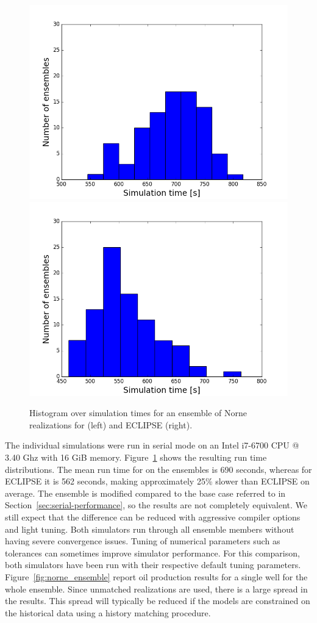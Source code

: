 \begin{figure}
  \includegraphics[width=.49\textwidth]{figures/norne/runTimeNorne.png} \hfill
  \includegraphics[width=.49\textwidth]{figures/norne/runTimeNorneEcl.png}
  \caption{Histogram over simulation times for an ensemble of Norne realizations for
    \opmflow (left) and ECLIPSE (right).}
  \label{fig:norne_performance}
\end{figure}

The individual simulations were run in serial mode on an Intel i7-6700 CPU @ 3.40 Ghz with 16 GiB memory. 
Figure~\ref{fig:norne_performance} shows the resulting run time distributions.
The mean run time for \opmflow on the ensembles is 690 seconds, whereas for ECLIPSE it
is 562 seconds, making \opmflow approximately 25\% slower than ECLIPSE on average.
The ensemble is modified compared to the base case referred to
in Section~\ref{sec:serial-performance}, so the results are not
completely equivalent. We still expect that the difference can be reduced with
aggressive compiler options and light tuning.
Both simulators run through all ensemble members without having severe convergence issues.
Tuning of numerical parameters such as tolerances can sometimes
improve simulator performance. For this comparison, both simulators
have been run with their respective default tuning parameters.
Figure~\ref{fig:norne_ensemble} report oil production results for a single well for the whole ensemble. 
Since unmatched realizations are used, there is a large spread in the results. This spread will typically be
reduced if the models are constrained on the historical data using a history matching procedure.  


